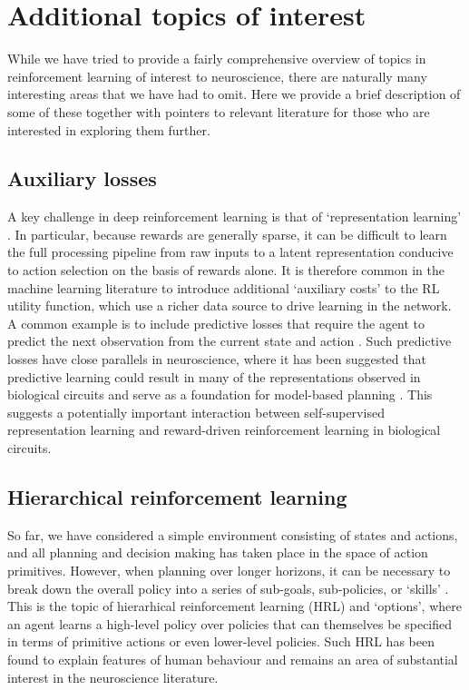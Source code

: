 \section{Additional topics of interest}
\label{sec:additional}

While we have tried to provide a fairly comprehensive overview of topics in reinforcement learning of interest to neuroscience, there are naturally many interesting areas that we have had to omit.
Here we provide a brief description of some of these together with pointers to relevant literature for those who are interested in exploring them further.

\subsection{Auxiliary losses}
\label{sec:auxiliary}
A key challenge in deep reinforcement learning is that of `representation learning' \citep{botvinick2020deep}.
In particular, because rewards are generally sparse, it can be difficult to learn the full processing pipeline from raw inputs to a latent representation conducive to action selection on the basis of rewards alone.
It is therefore common in the machine learning literature to introduce additional `auxiliary costs' to the RL utility function, which use a richer data source to drive learning in the network.
A common example is to include predictive losses that require the agent to predict the next observation from the current state and action \citep{jaderberg2016reinforcement, zintgraf2019varibad}.
Such predictive losses have close parallels in neuroscience, where it has been suggested that predictive learning could result in many of the representations observed in biological circuits \citep{rao1999predictive, stachenfeld2017hippocampus, whittington2020tolman, blanco2021dopamine} and serve as a foundation for model-based planning \citep{jensen2023recurrent}.
This suggests a potentially important interaction between self-supervised representation learning and reward-driven reinforcement learning in biological circuits.

\subsection{Hierarchical reinforcement learning}
\label{sec:HRL}
So far, we have considered a simple environment consisting of states and actions, and all planning and decision making has taken place in the space of action primitives.
However, when planning over longer horizons, it can be necessary to break down the overall policy into a series of sub-goals, sub-policies, or `skills' \citep{sutton1999between, pateria2021hierarchical}.
This is the topic of hierarhical reinforcement learning (HRL) and `options', where an agent learns a high-level policy over policies that can themselves be specified in terms of primitive actions or even lower-level policies.
Such HRL has been found to explain features of human behaviour \citep{eckstein2020computational,botvinick2008hierarchical,botvinick2009hierarchically} and remains an area of substantial interest in the neuroscience literature.


